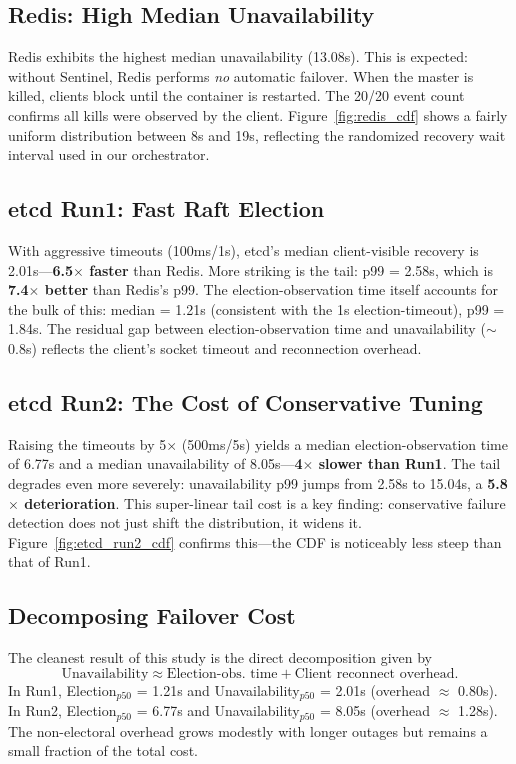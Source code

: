 \documentclass[conference]{IEEEtran}
\begin{document}
\subsection{Redis: High Median Unavailability}
Redis exhibits the highest median unavailability (13.08s). This is expected: without Sentinel, Redis performs \textit{no} automatic failover. When the master is killed, clients block until the container is restarted. The 20/20 event count confirms all kills were observed by the client. Figure~\ref{fig:redis_cdf} shows a fairly uniform distribution between 8s and 19s, reflecting the randomized recovery wait interval used in our orchestrator.

\subsection{etcd Run1: Fast Raft Election}
With aggressive timeouts (100ms/1s), etcd's median client-visible recovery is 2.01s---\textbf{6.5$\times$ faster} than Redis. More striking is the tail: p99 = 2.58s, which is \textbf{7.4$\times$ better} than Redis's p99. The election-observation time itself accounts for the bulk of this: median = 1.21s (consistent with the 1s election-timeout), p99 = 1.84s. The residual gap between election-observation time and unavailability ($\sim$0.8s) reflects the client's socket timeout and reconnection overhead.

\subsection{etcd Run2: The Cost of Conservative Tuning}
Raising the timeouts by 5$\times$ (500ms/5s) yields a median election-observation time of 6.77s and a median unavailability of 8.05s---\textbf{4$\times$ slower than Run1}. The tail degrades even more severely: unavailability p99 jumps from 2.58s to 15.04s, a \textbf{5.8$\times$ deterioration}. This super-linear tail cost is a key finding: conservative failure detection does not just shift the distribution, it widens it. Figure~\ref{fig:etcd_run2_cdf} confirms this---the CDF is noticeably less steep than that of Run1.

\subsection{Decomposing Failover Cost}
The cleanest result of this study is the direct decomposition given by
\begin{equation}
\text{Unavailability} \approx \text{Election-obs. time} + \text{Client reconnect overhead}.
\end{equation}
In Run1, Election$_{p50}$ = 1.21s and Unavailability$_{p50}$ = 2.01s (overhead $\approx$ 0.80s). In Run2, Election$_{p50}$ = 6.77s and Unavailability$_{p50}$ = 8.05s (overhead $\approx$ 1.28s). The non-electoral overhead grows modestly with longer outages but remains a small fraction of the total cost.
\end{document}
